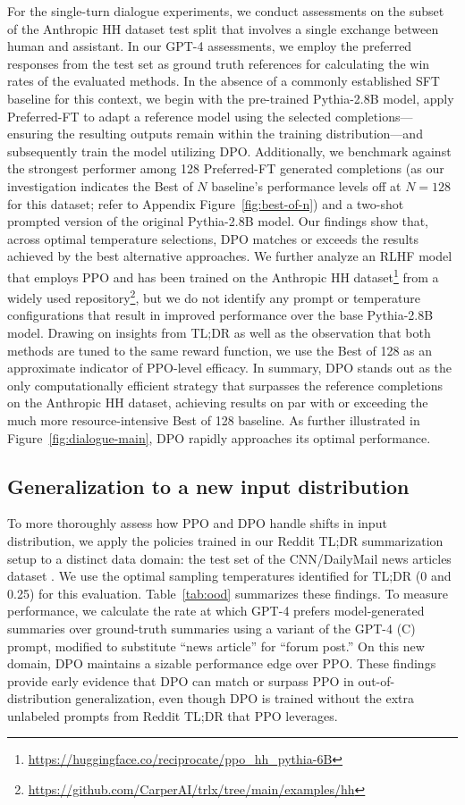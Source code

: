 For the single-turn dialogue experiments, we conduct assessments on the subset of the Anthropic HH dataset \citep{bai2022training} test split that involves a single exchange between human and assistant. In our GPT-4 assessments, we employ the preferred responses from the test set as ground truth references for calculating the win rates of the evaluated methods. In the absence of a commonly established SFT baseline for this context, we begin with the pre-trained Pythia-2.8B model, apply Preferred-FT to adapt a reference model using the selected completions—ensuring the resulting outputs remain within the training distribution—and subsequently train the model utilizing DPO. Additionally, we benchmark against the strongest performer among 128 Preferred-FT generated completions (as our investigation indicates the Best of $N$ baseline’s performance levels off at $N=128$ for this dataset; refer to Appendix Figure~\ref{fig:best-of-n}) and a two-shot prompted version of the original Pythia-2.8B model. Our findings show that, across optimal temperature selections, DPO matches or exceeds the results achieved by the best alternative approaches. We further analyze an RLHF model that employs PPO and has been trained on the Anthropic HH dataset\footnote{\url{https://huggingface.co/reciprocate/ppo_hh_pythia-6B}} from a widely used repository\footnote{\url{https://github.com/CarperAI/trlx/tree/main/examples/hh}}, but we do not identify any prompt or temperature configurations that result in improved performance over the base Pythia-2.8B model. Drawing on insights from TL;DR as well as the observation that both methods are tuned to the same reward function, we use the Best of 128 as an approximate indicator of PPO-level efficacy. In summary, DPO stands out as the only computationally efficient strategy that surpasses the reference completions on the Anthropic HH dataset, achieving results on par with or exceeding the much more resource-intensive Best of 128 baseline. As further illustrated in Figure~\ref{fig:dialogue-main}, DPO rapidly approaches its optimal performance.

\subsection{Generalization to a new input distribution}

To more thoroughly assess how PPO and DPO handle shifts in input distribution, we apply the policies trained in our Reddit TL;DR summarization setup to a distinct data domain: the test set of the CNN/DailyMail news articles dataset \citep{nallapati-etal-2016-abstractive}. We use the optimal sampling temperatures identified for TL;DR (0 and 0.25) for this evaluation. Table~\ref{tab:ood} summarizes these findings. To measure performance, we calculate the rate at which GPT-4 prefers model-generated summaries over ground-truth summaries using a variant of the GPT-4 (C) prompt, modified to substitute “news article” for “forum post.” On this new domain, DPO maintains a sizable performance edge over PPO. These findings provide early evidence that DPO can match or surpass PPO in out-of-distribution generalization, even though DPO is trained without the extra unlabeled prompts from Reddit TL;DR that PPO leverages.

